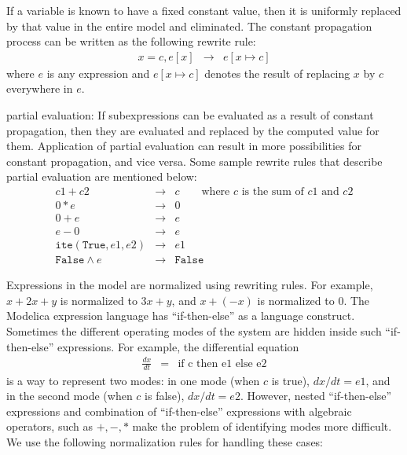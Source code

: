 \documentclass{llncs}
\newcommand\ite{{\mathtt{ite}}}
\newcommand\True{{\mathtt{True}}}
\newcommand\False{{\mathtt{False}}}
\begin{document}
\begin{description}
\item[Constant propagation:]  If a variable is known to have a fixed constant value,
then it is uniformly replaced by that value in the entire model and eliminated.
The constant propagation process can be written as the following rewrite rule:
\begin{eqnarray}
 x = c,  e[x]  & \rightarrow & e[x \mapsto c] 
\label{eqn-first}
\end{eqnarray}
where $e$ is any expression and $e[x\mapsto c]$ denotes the result of 
replacing $x$ by $c$ everywhere in $e$.
\item partial evaluation:  
If subexpressions can be evaluated as a result of constant propagation, then they
are evaluated and replaced by the computed value for them.  Application of
partial evaluation can result in more possibilities for constant propagation, and vice versa.
Some sample rewrite rules that describe partial evaluation are mentioned below:
\begin{eqnarray}
c1 + c2 & \rightarrow & c  \qquad \mbox{where $c$ is the sum of $c1$ and $c2$}
\\
0 * e & \rightarrow & 0
\\
0 + e & \rightarrow & e
\\
e - 0 & \rightarrow & e
\\
\ite(\True, e1, e2) & \rightarrow & e1
\\
\False \wedge e & \rightarrow & \False
\end{eqnarray}
\item[Term normalization:]
Expressions in the model are normalized using rewriting rules. For example,
$x + 2x + y$ is  normalized to $3x + y$, and $x + (-x)$ is normalized to $0$.
The Modelica expression language has ``if-then-else'' as a language construct.
Sometimes the different operating modes of the system are hidden inside such
``if-then-else'' expressions.
For example, the differential equation 
\begin{eqnarray*}
 \frac{dx}{dt} & = & \mbox{if c then e1 else e2}
\end{eqnarray*}
is a way to represent two modes: in one mode (when $c$ is true), $dx/dt = e1$,
and in the second mode (when $c$ is false), $dx/dt = e2$.
However, nested ``if-then-else'' expressions and combination of ``if-then-else'' expressions
with algebraic operators, such as $+, -, *$ make the problem of identifying modes more
difficult.
We use the following normalization rules for handling these cases:
\begin{eqnarray}

\end{eqnarray}
\end{description}
\end{document}
